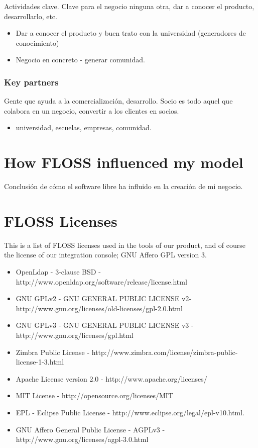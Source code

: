 \documentclass[11pt]{scrartcl}
\begin{document}
\par Actividades clave. Clave para el negocio ninguna otra, dar a conocer el producto, desarrollarlo, etc.
\begin{itemize}
    \item Dar a conocer el producto y buen trato con la universidad (generadores de conocimiento)
    \item Negocio en concreto - generar comunidad.
\end{itemize}
    
    
\subsubsection{Key partners}

\par Gente que ayuda a la comercialización, desarrollo. Socio es todo aquel que colabora en un negocio, convertir a los clientes en socios.
        \begin{itemize}
            \item universidad, escuelas, empresas, comunidad.
        \end{itemize}

\section{How FLOSS influenced my model}

Conclusión de cómo el software libre ha influido en la creación de mi negocio.

\section{FLOSS Licenses}\label{lic:floss}

This is a list of FLOSS licenses used in the tools of our product, and of course the license of our integration console; GNU Affero GPL version 3.

\begin{itemize}
    \item OpenLdap - 3-clause BSD - http://www.openldap.org/software/release/license.html
    \item GNU GPLv2 - GNU GENERAL PUBLIC LICENSE v2- http://www.gnu.org/licenses/old-licenses/gpl-2.0.html
    \item GNU GPLv3 - GNU GENERAL PUBLIC LICENSE v3 - http://www.gnu.org/licenses/gpl.html
    \item Zimbra Public License - http://www.zimbra.com/license/zimbra-public-license-1-3.html
    \item Apache License version 2.0 - http://www.apache.org/licenses/
    \item MIT License - http://opensource.org/licenses/MIT
    \item EPL - Eclipse Public License - http://www.eclipse.org/legal/epl-v10.html.
    \item GNU Affero General Public License - AGPLv3 - http://www.gnu.org/licenses/agpl-3.0.html
\end{itemize}
\end{document}
